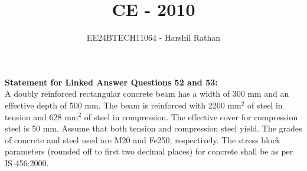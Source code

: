 \documentclass[journal]{IEEEtran}
\begin{document}

\vspace{3cm}

\title{CE - 2010}
\author{EE24BTECH11064 - Harshil Rathan}
 \maketitle
{\let\newpage\relax\maketitle}

\renewcommand{\thefigure}{\theenumi}
\renewcommand{\thetable}{\theenumi}
\setlength{\intextsep}{10pt} %


\renewcommand{\thetable}{\theenumi}
\textbf{Statement for Linked Answer Questions 52 and 53:} \\
A doubly reinforced rectangular concrete beam has a width of 300 mm and an effective depth of 500 mm. The beam is reinforced with 2200 mm\(^2\) of steel in tension and 628 mm\(^2\) of steel in compression. The effective cover for compression steel is 50 mm. Assume that both tension and compression steel yield. The grades of concrete and steel used are M20 and Fe250, respectively. The stress block parameters (rounded off to first two decimal places) for concrete shall be as per IS 456:2000.
\bigskip
\end{document}
